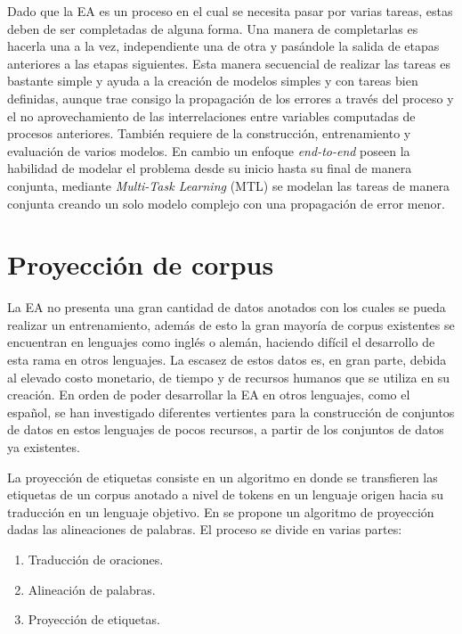 \documentclass[a4paper,11pt,twocolumn,twoside]{article}
\begin{document}
Dado que la EA es un proceso en el cual se necesita pasar por varias tareas, estas deben de ser completadas
de alguna forma. Una manera de completarlas es hacerla una a la vez, independiente una de otra y pasándole
la salida de etapas anteriores a las etapas siguientes. Esta manera secuencial de realizar las 
tareas es bastante simple y ayuda a la creación de modelos simples y con tareas bien definidas, aunque trae consigo 
la propagación de los errores a través del proceso y el no aprovechamiento de las interrelaciones entre variables 
computadas de procesos anteriores. También requiere de la construcción, entrenamiento y evaluación de varios modelos.
En cambio un enfoque \textit{end-to-end} poseen la habilidad de modelar el problema 
desde su inicio hasta su final de manera conjunta, mediante \textit{Multi-Task Learning} (MTL) se modelan
las tareas de manera conjunta creando un solo modelo complejo con una propagación de error menor.

\section{Proyección de corpus}

La EA no presenta una gran cantidad de datos anotados con los cuales se pueda realizar 
un entrenamiento, además de esto la gran mayoría de corpus existentes se encuentran en lenguajes como inglés o alemán,
haciendo difícil el desarrollo de esta rama en otros lenguajes.
La escasez de estos datos es, en gran parte, debida al elevado costo monetario, de tiempo y de recursos humanos que se utiliza
en su creación. En orden de poder desarrollar la EA en otros lenguajes, como el español, se han investigado diferentes vertientes
para la construcción de conjuntos de datos en estos lenguajes de pocos recursos, a partir de los conjuntos de datos ya 
existentes.

La proyección de etiquetas consiste en un algoritmo en donde se 
transfieren las etiquetas de un corpus anotado a nivel de tokens en un lenguaje origen hacia su traducción en un
lenguaje objetivo. En \cite{eger2018cross} se propone un algoritmo de proyección dadas las alineaciones de 
palabras. El proceso se divide en varias partes:

\begin{enumerate}
	\item Traducción de oraciones.
	\item Alineación de palabras.
	\item Proyección de etiquetas.
\end{enumerate}
\end{document}
